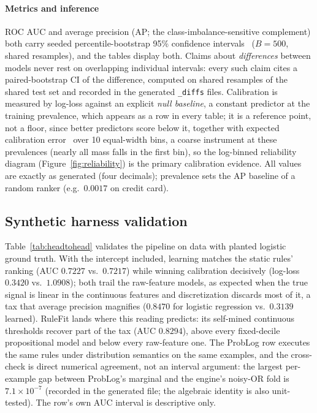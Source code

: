 \paragraph{Metrics and inference} ROC AUC and average precision (AP;
the class-imbalance-sensitive complement) both carry seeded
percentile-bootstrap 95\% confidence intervals~\cite{efron1993}
($B{=}500$, shared
resamples), and the tables display both. Claims about
\emph{differences} between models never rest on overlapping individual
intervals: every such claim cites a paired-bootstrap CI of the
difference, computed on shared resamples of the shared test set and
recorded in the generated \texttt{\_diffs} files. Calibration is
measured by log-loss against an explicit \emph{null baseline}, a
constant predictor at the training prevalence, which appears as a row
in every table; it is a reference point, not a floor, since better
predictors score below it, together with expected calibration
error~\cite{naeini2015} over 10 equal-width bins, a
coarse instrument at these prevalences (nearly all mass falls in the
first bin), so the log-binned reliability diagram
(Figure~\ref{fig:reliability}) is the primary calibration evidence.
All values are exactly as generated (four decimals); prevalence sets
the AP baseline of a random ranker (e.g.\ $0.0017$ on credit card).

\subsection{Synthetic harness validation}

Table~\ref{tab:headtohead} validates the pipeline on data with planted
logistic ground truth. With the intercept included, learning matches the
static rules' ranking (AUC $0.7227$ vs.\ $0.7217$) while winning
calibration decisively (log-loss $0.3420$ vs.\ $1.0908$); both trail the
raw-feature models, as expected when the true signal is linear in the
continuous features and discretization discards most of it, a tax
that average precision magnifies ($0.8470$ for logistic regression vs.\
$0.3139$ learned). RuleFit lands where this reading predicts:
its self-mined continuous thresholds recover part of the tax (AUC
$0.8294$), above every fixed-decile propositional model and below
every raw-feature one. The ProbLog
row executes the same rules under distribution semantics on the same
examples, and the cross-check is direct numerical agreement, not an
interval argument: the largest per-example gap between ProbLog's
marginal and the engine's noisy-OR fold is $7.1\times10^{-7}$
(recorded in the generated file; the algebraic identity is also
unit-tested). The row's own AUC interval is descriptive only.

